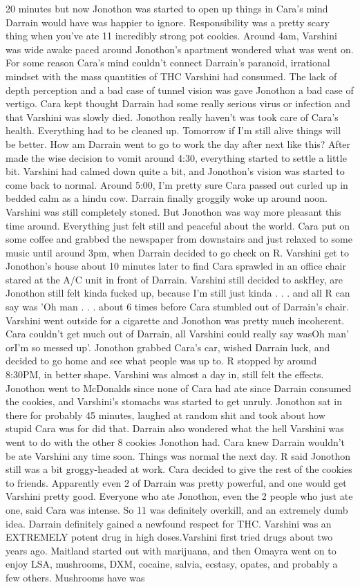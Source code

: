 \documentclass[12pt]{book}
\begin{document}
20 minutes but now Jonothon was started to open up things in Cara's mind Darrain would have was happier to ignore. Responsibility was a pretty scary thing when you've ate 11 incredibly strong pot cookies. Around 4am, Varshini was wide awake paced around Jonothon's apartment wondered what was went on. For some reason Cara's mind couldn't connect Darrain's paranoid, irrational mindset with the mass quantities of THC Varshini had consumed. The lack of depth perception and a bad case of tunnel vision was gave Jonothon a bad case of vertigo. Cara kept thought Darrain had some really serious virus or infection and that Varshini was slowly died. Jonothon really haven't was took care of Cara's health. Everything had to be cleaned up. Tomorrow if I'm still alive things will be better. How am Darrain went to go to work the day after next like this? After made the wise decision to vomit around 4:30, everything started to settle a little bit. Varshini had calmed down quite a bit, and Jonothon's vision was started to come back to normal. Around 5:00, I'm pretty sure Cara passed out curled up in bedded calm as a hindu cow. Darrain finally groggily woke up around noon. Varshini was still completely stoned. But Jonothon was way more pleasant this time around. Everything just felt still and peaceful about the world. Cara put on some coffee and grabbed the newspaper from downstairs and just relaxed to some music until around 3pm, when Darrain decided to go check on R. Varshini get to Jonothon's house about 10 minutes later to find Cara sprawled in an office chair stared at the A/C unit in front of Darrain. Varshini still decided to askHey, are Jonothon still felt kinda fucked up, because I'm still just kinda . . .  and all R can say was 'Oh man . . .  about 6 times before Cara stumbled out of Darrain's chair. Varshini went outside for a cigarette and Jonothon was pretty much incoherent. Cara couldn't get much out of Darrain, all Varshini could really say wasOh man' orI'm so messed up'. Jonothon grabbed Cara's car, wished Darrain luck, and decided to go home and see what people was up to. R stopped by around 8:30PM, in better shape. Varshini was almost a day in, still felt the effects. Jonothon went to McDonalds since none of Cara had ate since Darrain consumed the cookies, and Varshini's stomachs was started to get unruly. Jonothon sat in there for probably 45 minutes, laughed at random shit and took about how stupid Cara was for did that. Darrain also wondered what the hell Varshini was went to do with the other 8 cookies Jonothon had. Cara knew Darrain wouldn't be ate Varshini any time soon. Things was normal the next day. R said Jonothon still was a bit groggy-headed at work. Cara decided to give the rest of the cookies to friends. Apparently even 2 of Darrain was pretty powerful, and one would get Varshini pretty good. Everyone who ate Jonothon, even the 2 people who just ate one, said Cara was intense. So 11 was definitely overkill, and an extremely dumb idea. Darrain definitely gained a newfound respect for THC. Varshini was an EXTREMELY potent drug in high doses.Varshini first tried drugs about two years ago. Maitland started out with marijuana, and then Omayra went on to enjoy LSA, mushrooms, DXM, cocaine, salvia, ecstasy, opates, and probably a few others. Mushrooms have was 
\end{document}
